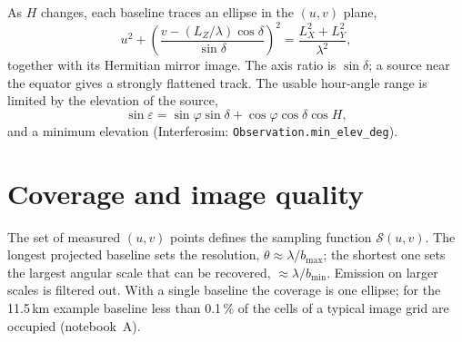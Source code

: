 As $H$ changes, each baseline traces an ellipse in the $(u,v)$ plane,
\begin{equation}
  u^2 + \left(\frac{v - (L_Z/\lambda)\cos\delta}{\sin\delta}\right)^2
  = \frac{L_X^2+L_Y^2}{\lambda^2},
\end{equation}
together with its Hermitian mirror image. The axis ratio is
$\sin\delta$; a source near the equator gives a strongly flattened track.
The usable hour-angle range is limited by the elevation of the source,
\begin{equation}
  \sin\varepsilon = \sin\varphi\sin\delta + \cos\varphi\cos\delta\cos H ,
\end{equation}
and a minimum elevation (Interferosim:
\texttt{Observation.min\_elev\_deg}).

\section{Coverage and image quality}

The set of measured $(u,v)$ points defines the sampling function
$\mathcal S(u,v)$. The longest projected baseline sets the resolution,
$\theta \approx \lambda/b_{\max}$; the shortest one sets the largest
angular scale that can be recovered, $\approx\lambda/b_{\min}$.
Emission on larger scales is filtered out. With a single baseline the
coverage is one ellipse; for the 11.5\,km example baseline less than
0.1\,\% of the cells of a typical image grid are occupied
(notebook~A).
